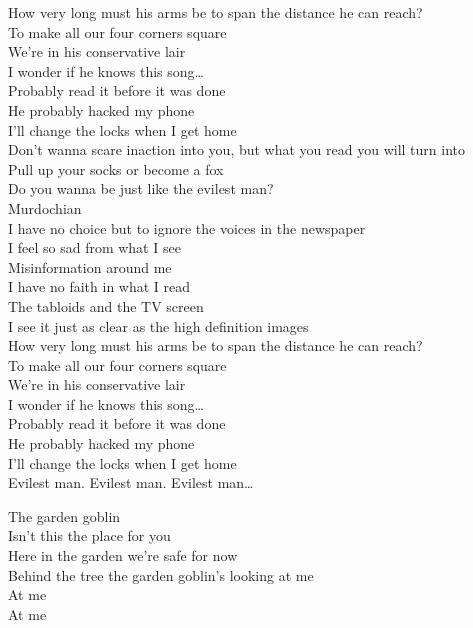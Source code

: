 How very long must his arms be to span the distance he can reach?\\
To make all our four corners square\\
We're in his conservative lair\\
I wonder if he knows this song…\\
Probably read it before it was done\\
He probably hacked my phone\\
I'll change the locks when I get home\\

Don't wanna scare inaction into you, but what you read you will turn into\\
Pull up your socks or become a fox\\
Do you wanna be just like the evilest man?\\
Murdochian\\

I have no choice but to ignore the voices in the newspaper\\
I feel so sad from what I see\\
Misinformation around me\\
I have no faith in what I read\\
The tabloids and the TV screen\\
I see it just as clear as the high definition images\\
How very long must his arms be to span the distance he can reach?\\
To make all our four corners square\\
We're in his conservative lair\\
I wonder if he knows this song…\\
Probably read it before it was done\\
He probably hacked my phone\\
I'll change the locks when I get home\\

Evilest man. Evilest man. Evilest man…\\




The garden goblin\\

Isn't this the place for you\\
Here in the garden we're safe for now\\
Behind the tree the garden goblin's looking at me\\
At me\\
At me\\

